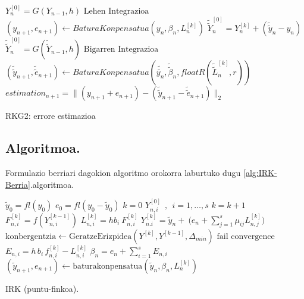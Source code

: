 \begin{algorithm}[h!]
  \BlankLine
  {
    \BlankLine
    $Y_n^{[0]}=G(Y_{n-1},h)$\;
    \BlankLine
    $\text{Lehen Integrazioa}$\;
	\BlankLine
    $(y_{n+1},e_{n+1})\leftarrow BaturaKonpensatua(y_n,\beta_n,L_n^{[k]})$\;      
    \BlankLine
    \BlankLine
    {$\tilde{\tilde{Y}}_{n}^{[0]}=Y_{n}^{[k]}+(\tilde{\tilde{y}}_n-y_n)$\;}
    {$\tilde{\tilde{Y}}_{n}^{[0]}=G(\tilde{\tilde{Y}}_{n-1},h)$\;}
    \BlankLine
    $\text{Bigarren Integrazioa}$\;
	\BlankLine
    $(\tilde{\tilde{y}}_{n+1},\tilde{\tilde{e}}_{n+1})\leftarrow BaturaKonpensatua(\tilde{\tilde{y_n}},\tilde{\tilde{\beta}}_n,floatR(\tilde{\tilde{L}}_n^{[k]},r))$\;  
    \BlankLine
    \BlankLine
    $estimation_{n+1}=\|(y_{n+1}+e_{n+1})-(\tilde{\tilde{y}}_{n+1}-\tilde{\tilde{e}}_{n+1})\|_2$\;
    \BlankLine
   }
 \caption{RKG2: errore estimazioa}
 \label{alg:errore-estimazioa}
\end{algorithm}


\subsection{Algoritmoa.}

Formulazio berriari dagokion algoritmo orokorra laburtuko dugu \ref{alg:IRK-Berria}.algoritmoa.

\begin{algorithm}[h!]
 \BlankLine
  $\tilde{y}_0=fl(y_0)$\;
  $e_0=fl(y_0-\tilde{y}_0)$\;
  {
   \BlankLine
   $k=0$\;
     $Y_{n,i}^{[0]} \ \ , \ \ i=1,\dots,s $\;
   \BlankLine
   {
    \BlankLine 
    $k=k+1$\;
    $F_{n,i}^{[k]}=f(Y_{n,i}^{[k-1]}) $\;
    $L_{n,i}^{[k]}=hb_i \ F_{n,i}^{[k]} $\;
    $Y_{n.i}^{[k]}=\tilde{y}_{n} + \ \big(e_n+\sum\limits_{j=1}^{s} \mu_{ij} L_{n,j}^{[k]}\big)  $\;  
    $\text{konbergentzia} \leftarrow \text{GeratzeErizpidea}(Y^{[k]},Y^{[k-1]},\Delta_{min}) $\;
   }
   \BlankLine
   {
   {$\text{fail convergence}$\;}
   }
   $E_{n,i} = h\,   b_i\,f_{n,i}^{[k]}-L_{n,i}^{[k]}$\;
   $\beta_{n}=e_{n}+\sum_{i=1}^{s} E_{n,i}$\;
   $(\tilde y_{n+1}, e_{n+1})\leftarrow \text{baturakonpensatua}(\tilde y_{n},\beta_{n},L_{n}^{[k]})$\;
   \BlankLine
 }
 \caption{IRK (puntu-finkoa).}
 \label{alg:IRK-Berria}
\end{algorithm}

